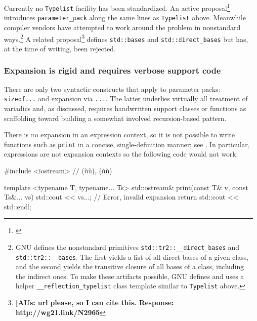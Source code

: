 \noindent Currently no \lstinline!Typelist! facility has been standardized. An active
proposal{\cprotect\footnote{\cite{spertus13}}}
introduces \lstinline!parameter_pack! along the same lines as
\lstinline!Typelist! above. Meanwhile compiler vendors have attempted to
work around the problem in nonstandard ways.{\cprotect\footnote{GNU
defines the nonstandard primitives
\lstinline!std::tr2::__direct_bases! and \lstinline!std::tr2::__bases!.
The first yields a list of all direct bases of a given class, and the
second yields the transitive closure of all bases of a class,
including the indirect ones. To make these artifacts possible, GNU
defines and uses a helper \lstinline!__reflection_typelist! class
  template similar to \lstinline!Typelist! above.}} A related
proposal{\cprotect\footnote{\textbf{[AUs: url please, so I can cite this.  Response: http://wg21.link/N2965}}} defines
\lstinline!std::bases! and \lstinline!std::direct_bases! but has, at the time
of writing, been rejected.

\subsubsection[Expansion is rigid and requires verbose support code]{Expansion is rigid and requires verbose support code}\label{expansion-is-rigid-and-requires-verbose-support-code}

There are only two syntactic constructs that apply to parameter packs:
\lstinline!sizeof...! and expansion via \lstinline!...!. The latter underlies
virtually all treatment of variadics and, as discussed, requires
handwritten support classes or functions as scaffolding toward building
a somewhat involved recursion-based pattern.

There is no expansion in an expression context, so it is not possible to
write functions such as \lstinline!print! in a concise, single-definition
manner; see . In particular, expressions are not expansion contexts so
the following code would not work:

\begin{emcppslisting}
#include <iostream>  // (ù{}ù), (ù{}ù)

template <typename T, typename... Ts>
std::ostream& print(const T& v, const Ts&... vs)
{
    std::cout << vs...;             // Error, invalid expansion
    return std::cout << std::endl;
}
\end{emcppslisting}
    

